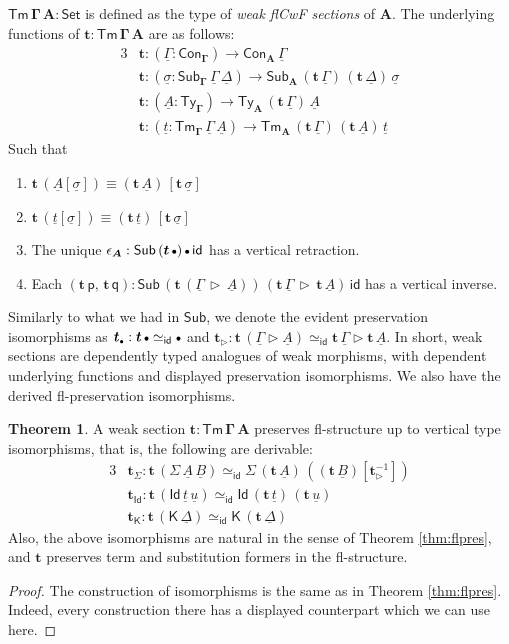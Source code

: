 \documentclass[12pt,a4paper,twoside,openany]{book}
\theoremstyle{remark}
\theoremstyle{definition}
\theoremstyle{theorem}
\newtheorem{theorem}{Theorem}
\newcommand{\bs}[1]{\boldsymbol{#1}}
\newcommand{\id}{\mathsf{id}}
\newcommand{\Con}{\mathsf{Con}}
\newcommand{\Sub}{\mathsf{Sub}}
\newcommand{\Tm}{\mathsf{Tm}}
\newcommand{\Ty}{\mathsf{Ty}}
\newcommand{\Id}{\mathsf{Id}}
\newcommand{\ra}{\rightarrow}
\newcommand{\Set}{\mathsf{Set}}
\newcommand{\ext}{\triangleright}
\newcommand{\emptycon}{\scaleobj{.75}\bullet}
\newcommand{\p}{\mathsf{p}}
\newcommand{\q}{\mathsf{q}}
\newcommand{\K}{\mathsf{K}}
\newcommand{\bSub}{\bs{\Sub}}
\newcommand{\bTm}{\bs{\Tm}}
\newcommand{\bGamma}{\bs{\Gamma}}
\newcommand{\bt}{\bs{t}}
\newcommand{\bA}{\bs{A}}
\newcommand{\ul}[1]{\underline{#1}}
\newcommand{\ulGamma}{\ul{\Gamma}}
\newcommand{\ulDelta}{\ul{\Delta}}
\newcommand{\ulsigma}{\ul{\sigma}}
\newcommand{\ult}{\ul{t}}
\newcommand{\ulu}{\ul{u}}
\newcommand{\ulA}{\ul{A}}
\newcommand{\ulB}{\ul{B}}
\begin{document}
$\bs{\Tm\,\Gamma\,A} : \Set$ is defined as the type of
\emph{weak flCwF sections} of $\bA$. The underlying functions of $\bt :
\bTm\,\bGamma\,\bA$ are as follows:
\begingroup
\allowdisplaybreaks
\begin{alignat*}{3}
  & \bt : (\ulGamma : \Con_{\bGamma}) \ra \Con_{\bA}\,\ulGamma\\
  & \bt : (\ulsigma : \Sub_{\bGamma}\,\ulGamma\,\ulDelta)
         \ra \Sub_{\bA}\,(\bt\,\ulGamma)\,(\bt\,\ulDelta)\,\ulsigma\\
  & \bt : (\ulA : \Ty_{\bGamma}) \ra \Ty_{\bA}\,(\bt\,\ulGamma)\,\ulA\\
  & \bt : (\ult : \Tm_{\bGamma}\,\ulGamma\,\ulA) \ra
          \Tm_{\bA}\,(\bt\,\ulGamma)\,(\bt\,\ulA)\,\ult
\end{alignat*}
\endgroup
Such that
\begin{enumerate}
  \item $\bt\,(\ulA[\ulsigma]) \equiv (\bt\,\ulA)\,[\bt\,\ulsigma]$
  \item $\bt\,(\ult[\ulsigma]) \equiv (\bt\,\ult)\,[\bt\,\ulsigma]$
  \item The unique $\epsilon_{\bA} : \Sub\,(\bt\,\emptycon)\,\emptycon\,\id$ has a vertical retraction.
  \item Each $(\bt\,\p,\,\bt\,\q) : \Sub\,(\bt\,(\ulGamma\,\ext\,\ulA))\,(\bt\,\ulGamma\,\ext\,\bt\,\ulA)\,\id$ has a vertical inverse.
\end{enumerate}

Similarly to what we had in $\bSub$, we denote the evident preservation
isomorphisms as $\bt_{\emptycon} : \bt\,\emptycon \simeq_{\id} \emptycon$ and
$\bt_{\ext} : \bt\,(\ulGamma\ext \ulA) \simeq_{\id} \bt\,\ulGamma \ext
\bt\,\ulA$. In short, weak sections are dependently typed analogues of weak
morphisms, with dependent underlying functions and displayed preservation
isomorphisms. We also have the derived fl-preservation isomorphisms.

\begin{theorem} A weak section $\bs{t : \Tm\,\Gamma\,A}$ preserves fl-structure up to vertical type isomorphisms, that is, the following are derivable:
\begin{alignat*}{3}
  & \bt_{\Sigma} : \bt\,(\Sigma\,\ulA\,\ulB) \simeq_{\id} \Sigma\,(\bt\,\ulA)\,((\bt\,\ulB)[\bt_{\ext}^{-1}]) \\
  & \bt_{\Id} : \bt\,(\Id\,\ult\,\ulu) \simeq_{\id} \Id\,(\bt\,\ult)\,(\bt\,\ulu)  \\
  & \bt_{\K} : \bt\,(\K\,\ulDelta) \simeq_{\id} \K\,(\bt\,\ulDelta)
\end{alignat*}
Also, the above isomorphisms are natural in the sense of Theorem
\ref{thm:flpres}, and $\bt$ preserves term and substitution formers in the
fl-structure.
\end{theorem}
\begin{proof}
The construction of isomorphisms is the same as in Theorem
\ref{thm:flpres}. Indeed, every construction there has a displayed counterpart
which we can use here.
\end{proof}
\end{document}
